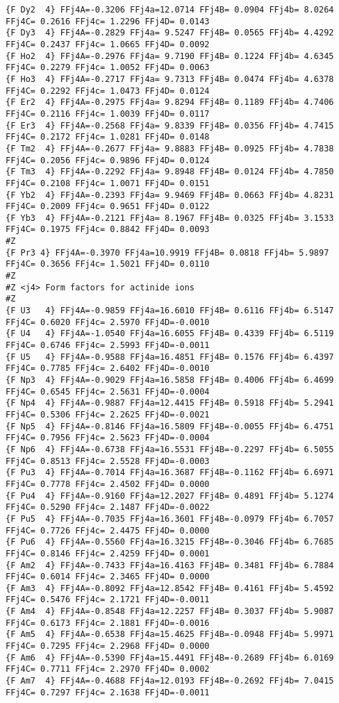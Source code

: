 {\begin{verbatim}
{F Dy2  4} FFj4A=-0.3206 FFj4a=12.0714 FFj4B= 0.0904 FFj4b= 8.0264 FFj4C= 0.2616 FFj4c= 1.2296 FFj4D= 0.0143 
{F Dy3  4} FFj4A=-0.2829 FFj4a= 9.5247 FFj4B= 0.0565 FFj4b= 4.4292 FFj4C= 0.2437 FFj4c= 1.0665 FFj4D= 0.0092 
{F Ho2  4} FFj4A=-0.2976 FFj4a= 9.7190 FFj4B= 0.1224 FFj4b= 4.6345 FFj4C= 0.2279 FFj4c= 1.0052 FFj4D= 0.0063 
{F Ho3  4} FFj4A=-0.2717 FFj4a= 9.7313 FFj4B= 0.0474 FFj4b= 4.6378 FFj4C= 0.2292 FFj4c= 1.0473 FFj4D= 0.0124 
{F Er2  4} FFj4A=-0.2975 FFj4a= 9.8294 FFj4B= 0.1189 FFj4b= 4.7406 FFj4C= 0.2116 FFj4c= 1.0039 FFj4D= 0.0117 
{F Er3  4} FFj4A=-0.2568 FFj4a= 9.8339 FFj4B= 0.0356 FFj4b= 4.7415 FFj4C= 0.2172 FFj4c= 1.0281 FFj4D= 0.0148 
{F Tm2  4} FFj4A=-0.2677 FFj4a= 9.8883 FFj4B= 0.0925 FFj4b= 4.7838 FFj4C= 0.2056 FFj4c= 0.9896 FFj4D= 0.0124 
{F Tm3  4} FFj4A=-0.2292 FFj4a= 9.8948 FFj4B= 0.0124 FFj4b= 4.7850 FFj4C= 0.2108 FFj4c= 1.0071 FFj4D= 0.0151 
{F Yb2  4} FFj4A=-0.2393 FFj4a= 9.9469 FFj4B= 0.0663 FFj4b= 4.8231 FFj4C= 0.2009 FFj4c= 0.9651 FFj4D= 0.0122 
{F Yb3  4} FFj4A=-0.2121 FFj4a= 8.1967 FFj4B= 0.0325 FFj4b= 3.1533 FFj4C= 0.1975 FFj4c= 0.8842 FFj4D= 0.0093 
#Z
{F Pr3 4} FFj4A=-0.3970 FFj4a=10.9919 FFj4B= 0.0818 FFj4b= 5.9897 FFj4C= 0.3656 FFj4c= 1.5021 FFj4D= 0.0110 
#Z
#Z <j4> Form factors for actinide ions
#Z
{F U3   4} FFj4A=-0.9859 FFj4a=16.6010 FFj4B= 0.6116 FFj4b= 6.5147 FFj4C= 0.6020 FFj4c= 2.5970 FFj4D=-0.0010 
{F U4   4} FFj4A=-1.0540 FFj4a=16.6055 FFj4B= 0.4339 FFj4b= 6.5119 FFj4C= 0.6746 FFj4c= 2.5993 FFj4D=-0.0011 
{F U5   4} FFj4A=-0.9588 FFj4a=16.4851 FFj4B= 0.1576 FFj4b= 6.4397 FFj4C= 0.7785 FFj4c= 2.6402 FFj4D=-0.0010 
{F Np3  4} FFj4A=-0.9029 FFj4a=16.5858 FFj4B= 0.4006 FFj4b= 6.4699 FFj4C= 0.6545 FFj4c= 2.5631 FFj4D=-0.0004 
{F Np4  4} FFj4A=-0.9887 FFj4a=12.4415 FFj4B= 0.5918 FFj4b= 5.2941 FFj4C= 0.5306 FFj4c= 2.2625 FFj4D=-0.0021 
{F Np5  4} FFj4A=-0.8146 FFj4a=16.5809 FFj4B=-0.0055 FFj4b= 6.4751 FFj4C= 0.7956 FFj4c= 2.5623 FFj4D=-0.0004 
{F Np6  4} FFj4A=-0.6738 FFj4a=16.5531 FFj4B=-0.2297 FFj4b= 6.5055 FFj4C= 0.8513 FFj4c= 2.5528 FFj4D=-0.0003 
{F Pu3  4} FFj4A=-0.7014 FFj4a=16.3687 FFj4B=-0.1162 FFj4b= 6.6971 FFj4C= 0.7778 FFj4c= 2.4502 FFj4D= 0.0000 
{F Pu4  4} FFj4A=-0.9160 FFj4a=12.2027 FFj4B= 0.4891 FFj4b= 5.1274 FFj4C= 0.5290 FFj4c= 2.1487 FFj4D=-0.0022 
{F Pu5  4} FFj4A=-0.7035 FFj4a=16.3601 FFj4B=-0.0979 FFj4b= 6.7057 FFj4C= 0.7726 FFj4c= 2.4475 FFj4D= 0.0000 
{F Pu6  4} FFj4A=-0.5560 FFj4a=16.3215 FFj4B=-0.3046 FFj4b= 6.7685 FFj4C= 0.8146 FFj4c= 2.4259 FFj4D= 0.0001 
{F Am2  4} FFj4A=-0.7433 FFj4a=16.4163 FFj4B= 0.3481 FFj4b= 6.7884 FFj4C= 0.6014 FFj4c= 2.3465 FFj4D= 0.0000 
{F Am3  4} FFj4A=-0.8092 FFj4a=12.8542 FFj4B= 0.4161 FFj4b= 5.4592 FFj4C= 0.5476 FFj4c= 2.1721 FFj4D=-0.0011 
{F Am4  4} FFj4A=-0.8548 FFj4a=12.2257 FFj4B= 0.3037 FFj4b= 5.9087 FFj4C= 0.6173 FFj4c= 2.1881 FFj4D=-0.0016 
{F Am5  4} FFj4A=-0.6538 FFj4a=15.4625 FFj4B=-0.0948 FFj4b= 5.9971 FFj4C= 0.7295 FFj4c= 2.2968 FFj4D= 0.0000 
{F Am6  4} FFj4A=-0.5390 FFj4a=15.4491 FFj4B=-0.2689 FFj4b= 6.0169 FFj4C= 0.7711 FFj4c= 2.2970 FFj4D= 0.0002 
{F Am7  4} FFj4A=-0.4688 FFj4a=12.0193 FFj4B=-0.2692 FFj4b= 7.0415 FFj4C= 0.7297 FFj4c= 2.1638 FFj4D=-0.0011 
\end{verbatim}
\begin{verbatim}


\end{verbatim}}
